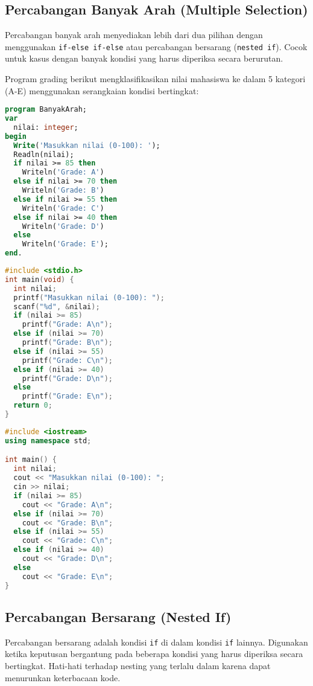 \documentclass[../main.tex]{subfiles}
\begin{document}
\subsection{Percabangan Banyak Arah (Multiple Selection)}
Percabangan banyak arah menyediakan lebih dari dua pilihan dengan menggunakan \texttt{if-else if-else} atau percabangan bersarang (\texttt{nested if}). Cocok untuk kasus dengan banyak kondisi yang harus diperiksa secara berurutan.

Program grading berikut mengklasifikasikan nilai mahasiswa ke dalam 5 kategori (A-E) menggunakan serangkaian kondisi bertingkat:

\begin{lstlisting}[language=Pascal, caption={Percabangan banyak arah di Pascal}]
program BanyakArah;
var
  nilai: integer;
begin
  Write('Masukkan nilai (0-100): ');
  Readln(nilai);
  if nilai >= 85 then
    Writeln('Grade: A')
  else if nilai >= 70 then
    Writeln('Grade: B')
  else if nilai >= 55 then
    Writeln('Grade: C')
  else if nilai >= 40 then
    Writeln('Grade: D')
  else
    Writeln('Grade: E');
end.
\end{lstlisting}

\begin{lstlisting}[language=C, caption={Percabangan banyak arah di C}]
#include <stdio.h>
int main(void) {
  int nilai;
  printf("Masukkan nilai (0-100): ");
  scanf("%d", &nilai);
  if (nilai >= 85)
    printf("Grade: A\n");
  else if (nilai >= 70)
    printf("Grade: B\n");
  else if (nilai >= 55)
    printf("Grade: C\n");
  else if (nilai >= 40)
    printf("Grade: D\n");
  else
    printf("Grade: E\n");
  return 0;
}
\end{lstlisting}

\begin{lstlisting}[language=C++, caption={Percabangan banyak arah di C++}]
#include <iostream>
using namespace std;

int main() {
  int nilai;
  cout << "Masukkan nilai (0-100): ";
  cin >> nilai;
  if (nilai >= 85)
    cout << "Grade: A\n";
  else if (nilai >= 70)
    cout << "Grade: B\n";
  else if (nilai >= 55)
    cout << "Grade: C\n";
  else if (nilai >= 40)
    cout << "Grade: D\n";
  else
    cout << "Grade: E\n";
}
\end{lstlisting}

\subsection{Percabangan Bersarang (Nested If)}
Percabangan bersarang adalah kondisi \texttt{if} di dalam kondisi \texttt{if} lainnya. Digunakan ketika keputusan bergantung pada beberapa kondisi yang harus diperiksa secara bertingkat. Hati-hati terhadap nesting yang terlalu dalam karena dapat menurunkan keterbacaan kode.
\end{document}
